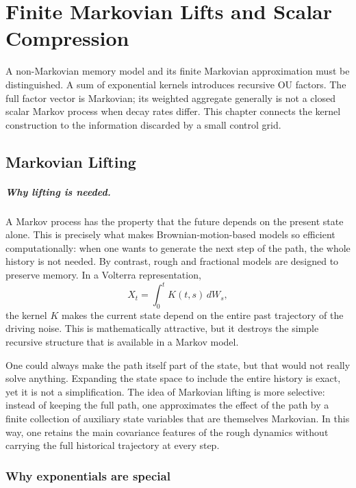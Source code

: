 \chapter{Finite Markovian Lifts and Scalar Compression}\label{ch:lift}
A non-Markovian memory model and its finite Markovian approximation must be distinguished. A sum of exponential kernels introduces recursive OU factors. The full factor vector is Markovian; its weighted aggregate generally is not a closed scalar Markov process when decay rates differ. This chapter connects the kernel construction to the information discarded by a small control grid.
\section{Markovian Lifting}


\paragraph{Why lifting is needed.}

A Markov process has the property that the future depends on the present state alone. This is precisely what makes Brownian-motion-based models so efficient computationally: when one wants to generate the next step of the path, the whole history is not needed. By contrast, rough and fractional models are designed to preserve memory. In a Volterra representation,
\[
X_t=\int_0^t K(t,s)\,dW_s,
\]
the kernel \(K\) makes the current state depend on the entire past trajectory of the driving noise. This is mathematically attractive, but it destroys the simple recursive structure that is available in a Markov model.

One could always make the path itself part of the state, but that would not really solve anything. Expanding the state space to include the entire history is exact, yet it is not a simplification. The idea of Markovian lifting is more selective: instead of keeping the full path, one approximates the effect of the path by a finite collection of auxiliary state variables that are themselves Markovian. In this way, one retains the main covariance features of the rough dynamics without carrying the full historical trajectory at every step.

\subsection{Why exponentials are special}


